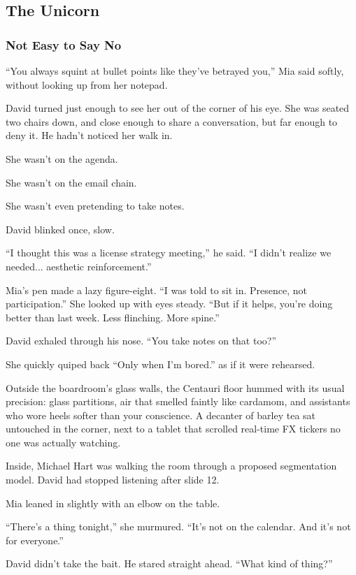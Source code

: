 
\subsection{The Unicorn}

\subsubsection{Not Easy to Say No}

``You always squint at bullet points like they’ve betrayed you,'' Mia said softly, without looking up from her notepad.

David turned just enough to see her out of the corner of his eye. She was seated two chairs down, and close 
enough to share a conversation, but far enough to deny it. He hadn’t noticed her walk in.

She wasn’t on the agenda.

She wasn’t on the email chain.

She wasn’t even pretending to take notes.

David blinked once, slow.

``I thought this was a license strategy meeting,'' he said. ``I didn’t realize we needed... aesthetic reinforcement.''

Mia’s pen made a lazy figure-eight. ``I was told to sit in. Presence, not participation.'' She looked up  
with eyes steady. ``But if it helps, you’re doing better than last week. Less flinching. More spine.''

David exhaled through his nose. ``You take notes on that too?''

She quickly quiped back ``Only when I’m bored.'' as if it were rehearsed.

Outside the boardroom’s glass walls, the Centauri floor hummed with its usual precision: glass partitions, air 
that smelled faintly like cardamom, and assistants who wore heels softer than your conscience. A decanter of barley 
tea sat untouched in the corner, next to a tablet that scrolled real-time FX tickers no one was actually watching.

Inside, Michael Hart was walking the room through a proposed segmentation model. David had stopped listening 
after slide 12.

Mia leaned in slightly with an elbow on the table.

``There’s a thing tonight,'' she murmured. ``It's not on the calendar. And it's not for everyone.''

David didn’t take the bait. He stared straight ahead. ``What kind of thing?''

